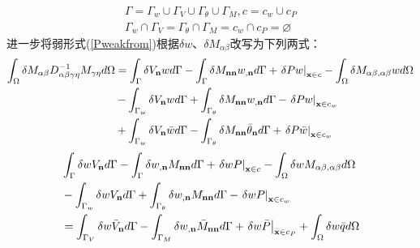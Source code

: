 \begin{equation}
    \begin{split}
    \Gamma=\Gamma_w\cup\Gamma_V\cup\Gamma_{\theta}\cup\Gamma_M,c=c_w\cup c_P\\
    \Gamma_w\cap\Gamma_V=\Gamma_{\theta}\cap\Gamma_M=c_w\cap c_P=\varnothing
\end{split}
\end{equation}
进一步将弱形式(\ref{Pweakfrom})根据$\delta w$、$\delta M_{\alpha\beta}$改写为下列两式：
\begin{equation}\label{Pweakform1}
    \begin{split}
        \int_\Omega {\delta {M_{\alpha \beta }}D_{\alpha \beta \gamma \eta }^{ - 1}{M_{\gamma \eta }}d\Omega }&=\int_\Gamma  {\delta {V_{\bf{n}}}wd\Gamma }  - \int_\Gamma  {\delta {M_{{\bf{nn}}}}{w_{,{\bf{n}}}}d\Gamma }+{\left. {\delta Pw} \right|_{{\bf{x}} \in c}} - \int_\Omega  {\delta {M_{\alpha \beta ,\alpha \beta }}wd\Omega } \\
        &-\int_{{\Gamma _w}} {\delta {V_{\bf{n}}}wd\Gamma }  + \int_{{\Gamma _\theta }} {\delta {M_{{\bf{nn}}}}{w_{,{\bf{n}}}}d\Gamma }  - {\left. {\delta Pw} \right|_{{\bf{x}} \in {c_w}}}\\
        &+\int_{{\Gamma _w}} {\delta {V_{\bf{n}}}\bar wd\Gamma }  - \int_{{\Gamma _\theta }} {\delta {M_{{\bf{nn}}}}{{\bar \theta }_{\bf{n}}}d\Gamma }  + {\left. {\delta P\bar w} \right|_{{\bf{x}} \in {c_w}}}
    \end{split}
\end{equation}
\begin{equation}
        \begin{split}\label{Pweakform2}
            &\int_\Gamma  {\delta w{V_{\bf{n}}}d\Gamma } - \int_\Gamma  {\delta {w_{,{\bf{n}}}}{M_{{\bf{nn}}}}d\Gamma }  + {\left. {\delta wP} \right|_{{\bf{x}} \in c}} - \int_\Omega  {\delta w{M_{\alpha \beta ,\alpha\beta}}d\Omega }\\
            &- \int_{{\Gamma _w}} {\delta w{V_{\bf{n}}}d\Gamma }  + \int_{{\Gamma _\theta }} {\delta {w_{,{\bf{n}}}}{M_{{\bf{nn}}}}d\Gamma }  - {\left. {\delta wP} \right|_{{\bf{x}} \in {c_w}}}\\
            &= \int_{{\Gamma _V}} {\delta w{{\bar V}_{\bf{n}}}d\Gamma }  - \int_{{\Gamma _M}} {\delta {w_{,{\bf{n}}}}{{\bar M}_{{\bf{nn}}}}d\Gamma }  + {\left. {\delta w\bar P} \right|_{{\bf{x}} \in {c_P}}} + \int_\Omega  {\delta w\bar qd\Omega} 
    \end{split}
\end{equation} 
